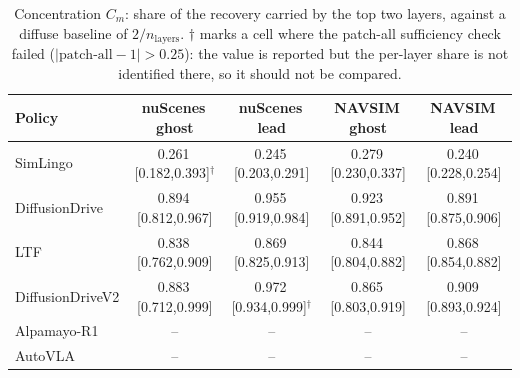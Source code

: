 \begin{table}[!tb]
\centering
\footnotesize
\setlength{\tabcolsep}{4pt}
\caption{Concentration $C_m$: share of the recovery carried by the top two layers, against a diffuse baseline of $2/n_{\mathrm{layers}}$. $\dagger$ marks a cell where the patch-all sufficiency check failed ($|\text{patch-all}-1|>0.25$): the value is reported but the per-layer share is not identified there, so it should not be compared.}
\label{tab:c}
\begin{tabular}{lcccc}
\toprule
Policy & nuScenes\,ghost & nuScenes\,lead & NAVSIM\,ghost & NAVSIM\,lead\\
\midrule
SimLingo & 0.261\,{\scriptsize[0.182,0.393]}$^\dagger$ & 0.245\,{\scriptsize[0.203,0.291]} & 0.279\,{\scriptsize[0.230,0.337]} & 0.240\,{\scriptsize[0.228,0.254]}\\
DiffusionDrive & 0.894\,{\scriptsize[0.812,0.967]} & 0.955\,{\scriptsize[0.919,0.984]} & 0.923\,{\scriptsize[0.891,0.952]} & 0.891\,{\scriptsize[0.875,0.906]}\\
LTF & 0.838\,{\scriptsize[0.762,0.909]} & 0.869\,{\scriptsize[0.825,0.913]} & 0.844\,{\scriptsize[0.804,0.882]} & 0.868\,{\scriptsize[0.854,0.882]}\\
DiffusionDriveV2 & 0.883\,{\scriptsize[0.712,0.999]} & 0.972\,{\scriptsize[0.934,0.999]}$^\dagger$ & 0.865\,{\scriptsize[0.803,0.919]} & 0.909\,{\scriptsize[0.893,0.924]}\\
Alpamayo-R1 & -- & -- & -- & --\\
AutoVLA & -- & -- & -- & --\\
\bottomrule
\end{tabular}
\end{table}
